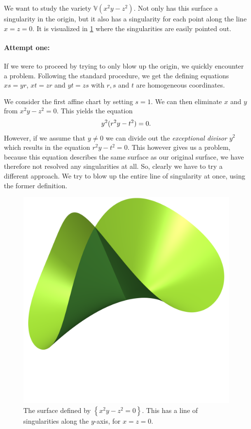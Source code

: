 \documentclass{article}
\newcommand{\V}{\mathbb{V}}
\begin{document}
\begin{example}
    We want to study the variety $\V(x^2y - z^2)$. Not only has this surface a
    singularity in the origin, but it also has a singularity for each point
    along the line $x = z = 0$. It is visualized in \cref{fig:blowup_line}
    where the singularities are easily pointed out.

    \paragraph{Attempt one:}
    \label{par:attempt_one}
    
    If we were to proceed by trying to only blow up the origin, we quickly
    encounter a problem.  Following the standard procedure, we get the defining
    equations $xs = yr$, $xt = zr$ and $yt = zs$ with $r, s$ and $t$ are
    homogeneous coordinates.

    We consider the first affine chart by setting $s = 1$. We can then
    eliminate $x$ and $y$ from $x^2y - z^2 = 0$. This yields the equation
    \begin{equation}
        \notag
        y^2(r^2y - t^2) = 0.
    \end{equation}
    However, if we assume that $y \neq 0$ we can divide out the
    \emph{exceptional divisor} $y^2$ which results
    in the equation $r^2y - t^2 = 0$. This however gives us a problem, because
    this equation describes the same surface as our original surface, we have
    therefore not resolved any singularities at all. So, clearly we have to try
    a different approach. We try to blow up the entire line of singularity at
    once, using the former definition.
    \begin{figure}[]
        \centering
        \includegraphics[width=0.3\linewidth]{../pictures/blowup_line.png}
        \caption{The surface defined by $\left\{ x^2y - z^2 = 0\right\}$. This
        has a line of singularities along the $y$-axis, for $x = z = 0$.}
        \label{fig:blowup_line}
    \end{figure}
    

\end{example}
\end{document}
